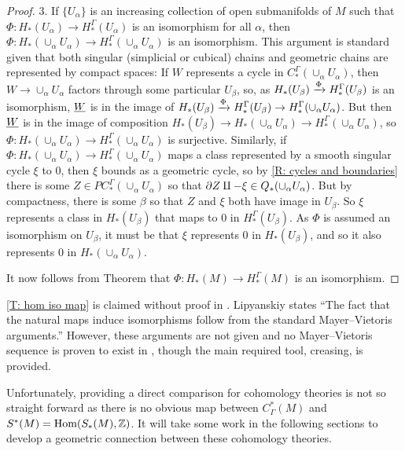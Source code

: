 \begin{proof}
	3.
	If $\{U_\alpha\}$ is an increasing collection of open submanifolds of $M$ such that $\Phi \colon H_*(U_\alpha) \to H_*^\Gamma(U_\alpha)$ is an isomorphism for all $\alpha$, then $\Phi \colon H_*(\cup_\alpha U_\alpha) \to H_*^\Gamma(\cup_\alpha U_\alpha)$ is an isomorphism.
	This argument is standard given that both singular (simplicial or cubical) chains and geometric chains are represented by compact spaces: If $W$ represents a cycle in $C_*^\Gamma(\cup_\alpha U_\alpha)$, then $W \to \cup_\alpha U_\alpha$ factors through some particular $U_\beta$, so, as $H_*(U_\beta) \xrightarrow{\Phi}H_*^\Gamma(U_\beta)$ is an isomorphism, $\underline{W}$ is in the image of $H_*(U_\beta) \xrightarrow{\Phi}H_*^\Gamma(U_\beta) \to H_*^\Gamma(\cup_\alpha U_\alpha)$.
	But then $\underline{W}$ is in the image of composition $H_*(U_\beta) \to H_*(\cup_\alpha U_\alpha) \to H_*^\Gamma(\cup_\alpha U_\alpha)$, so $\Phi \colon H_*(\cup_\alpha U_\alpha) \to H_*^\Gamma(\cup_\alpha U_\alpha)$ is surjective.
	Similarly, if $\Phi \colon H_*(\cup_\alpha U_\alpha) \to H_*^\Gamma(\cup_\alpha U_\alpha)$ maps a class represented by a smooth singular cycle $\xi$ to $0$, then $\xi$ bounds as a geometric cycle, so by \cref{R: cycles and boundaries} there is some $Z \in PC_*^\Gamma(\cup_\alpha U_\alpha)$ so that $\partial Z \amalg -\xi \in Q_*(\cup_\alpha U_\alpha)$.
	But by compactness, there is some $\beta$ so that $Z$ and $\xi$ both have image in $U_\beta$.
	So $\xi$ represents a class in $H_*(U_\beta)$ that maps to $0$ in $H_*^\Gamma(U_\beta)$.
	As $\Phi$ is assumed an isomorphism on $U_\beta$, it must be that $\xi$ represents $0$ in $H_*(U_\beta)$, and so it also represents $0$ in $H_*(\cup_\alpha U_\alpha)$.

	It now follows from Theorem \cite[5.1.1]{Frie20} that $\Phi: H_*(M) \to H_*^\Gamma(M)$ is an isomorphism.
\end{proof}

\cref{T: hom iso map} is claimed without proof in \cite[Section 10]{Lipy14}.
Lipyanskiy states ``The fact that the natural maps induce isomorphisms follow from the standard Mayer--Vietoris arguments.'' However, these arguments are not given and no Mayer--Vietoris sequence is proven to exist in \cite{Lipy14}, though the main required tool, creasing, is provided.

Unfortunately, providing a direct comparison for cohomology theories is not so straight forward as there is no obvious map between $C^*_\Gamma(M)$ and $S^*(M) = \textup{Hom}(S_*(M),\mathbb{Z})$.
It will take some work in the following sections to develop a geometric connection between these cohomology theories.

